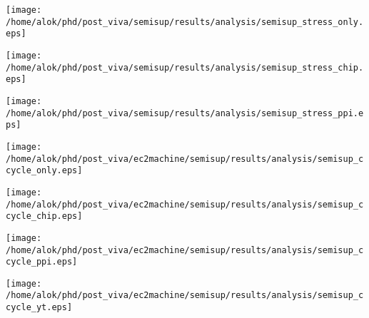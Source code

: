 \begin{center}
 \texttt{[image: /home/alok/phd/post\_viva/semisup/results/analysis/semisup\_stress\_only.eps]}
\end{center}

\begin{center}
 \texttt{[image: /home/alok/phd/post\_viva/semisup/results/analysis/semisup\_stress\_chip.eps]}
\end{center}

\begin{center}
 \texttt{[image: /home/alok/phd/post\_viva/semisup/results/analysis/semisup\_stress\_ppi.eps]}
\end{center}

\begin{center}
 \texttt{[image: /home/alok/phd/post\_viva/ec2machine/semisup/results/analysis/semisup\_ccycle\_only.eps]}
\end{center}

\begin{center}
 \texttt{[image: /home/alok/phd/post\_viva/ec2machine/semisup/results/analysis/semisup\_ccycle\_chip.eps]}
\end{center}
\begin{center}
 \texttt{[image: /home/alok/phd/post\_viva/ec2machine/semisup/results/analysis/semisup\_ccycle\_ppi.eps]}
\end{center}
\begin{center}
 \texttt{[image: /home/alok/phd/post\_viva/ec2machine/semisup/results/analysis/semisup\_ccycle\_yt.eps]}
\end{center}




